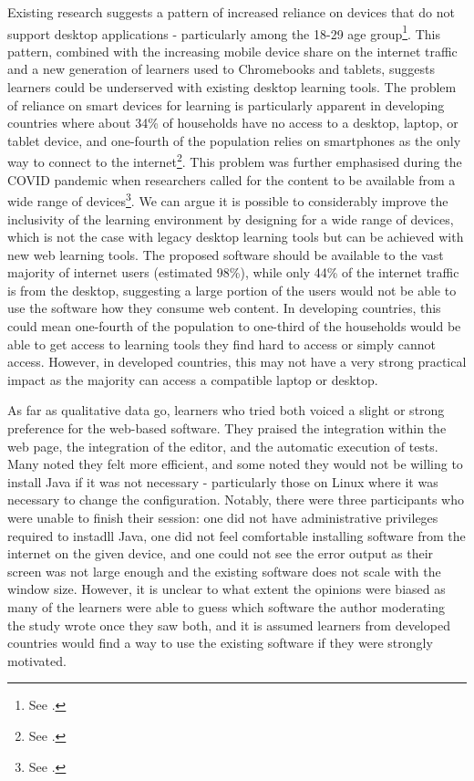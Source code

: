{Existing research suggests a pattern of increased reliance on devices that do not support desktop applications - particularly among the 18-29 age group\footnote{See .}.
This pattern, combined with the increasing mobile device share on the internet traffic and a new generation of learners used to Chromebooks and tablets, suggests learners could be underserved with existing desktop learning tools.
The problem of reliance on smart devices for learning is particularly apparent in developing countries where about 34\% of households have no access to a desktop, laptop, or tablet device, and one-fourth of the population relies on smartphones as the only way to connect to the internet\footnote{See .}.
This problem was further emphasised during the COVID pandemic when researchers called for the content to be available from a wide range of devices\footnote{See .}.
We can argue it is possible to considerably improve the inclusivity of the learning environment by designing for a wide range of devices, which is not the case with legacy desktop learning tools but can be achieved with new web learning tools.
The proposed software should be available to the vast majority of internet users (estimated 98\%), while only 44\% of the internet traffic is from the desktop, suggesting a large portion of the users would not be able to use the software how they consume web content.
In developing countries, this could mean one-fourth of the population to one-third of the households would be able to get access to learning tools they find hard to access or simply cannot access.
However, in developed countries, this may not have a very strong practical impact as the majority can access a compatible laptop or desktop.

As far as qualitative data go, learners who tried both voiced a slight or strong preference for the web-based software.
They praised the integration within the web page, the integration of the editor, and the automatic execution of tests.
Many noted they felt more efficient, and some noted they would not be willing to install Java if it was not necessary - particularly those on Linux where it was necessary to change the configuration.
Notably, there were three participants who were unable to finish their session: one did not have administrative privileges required to instadll Java, one did not feel comfortable installing software from the internet on the given device, and one could not see the error output as their screen was not large enough and the existing software does not scale with the window size.
However, it is unclear to what extent the opinions were biased as many of the learners were able to guess which software the author moderating the study wrote once they saw both, and it is assumed learners from developed countries would find a way to use the existing software if they were strongly motivated.

}

